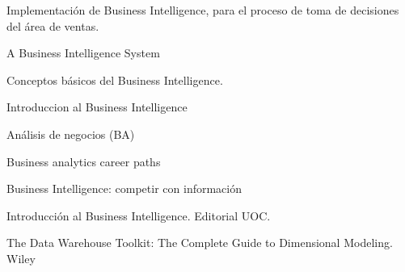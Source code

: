 \documentclass[twoside,twocolumn]{article}
\begin{document}


\begin{thebibliography}{99} 

\newblock Implementación de Business Intelligence, para el proceso de toma de decisiones del área de ventas.

\newblock A Business Intelligence System

Conceptos básicos del Business Intelligence.

\newblock Introduccion al Business Intelligence

\newblock Análisis de negocios (BA)

\newblock Business analytics career paths

\newblock Business Intelligence: competir con información


\bibitem[Curto J., 2010]{} 
\newblock Introducción al Business Intelligence. Editorial UOC.

\newblock  The Data Warehouse Toolkit: The Complete Guide to Dimensional Modeling. Wiley
 
\end{thebibliography}


\end{document}
